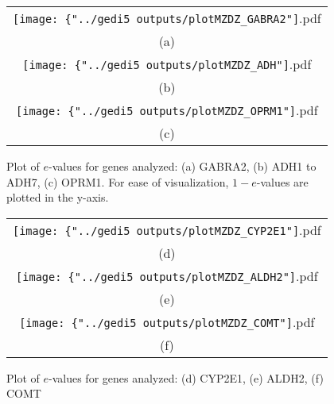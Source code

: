 \begin{figure}
\begin{center}

\begin{tabular}{c}
		\texttt{[image: \{"../gedi5 outputs/plotMZDZ\_GABRA2"]}.pdf}\\
		(a)\\
		\texttt{[image: \{"../gedi5 outputs/plotMZDZ\_ADH"]}.pdf} \\
		(b)\\	
		\texttt{[image: \{"../gedi5 outputs/plotMZDZ\_OPRM1"]}.pdf}\\
		(c)\\	
\end{tabular}

\caption{Plot of $e$-values for genes analyzed: (a) GABRA2, (b) ADH1 to ADH7, (c) OPRM1. For ease of visualization, $1 - e$-values are plotted in the y-axis.}
\label{fig:geneplot1}

\end{center}
\end{figure}

\begin{figure}
\begin{center}

\begin{tabular}{c}
		\texttt{[image: \{"../gedi5 outputs/plotMZDZ\_CYP2E1"]}.pdf}\\
		(d)\\
		\texttt{[image: \{"../gedi5 outputs/plotMZDZ\_ALDH2"]}.pdf} \\
		(e)\\	
		\texttt{[image: \{"../gedi5 outputs/plotMZDZ\_COMT"]}.pdf}\\
		(f)\\	
\end{tabular}

\caption{Plot of $e$-values for genes analyzed: (d) CYP2E1, (e) ALDH2, (f) COMT}
\label{fig:geneplot2}

\end{center}
\end{figure}

